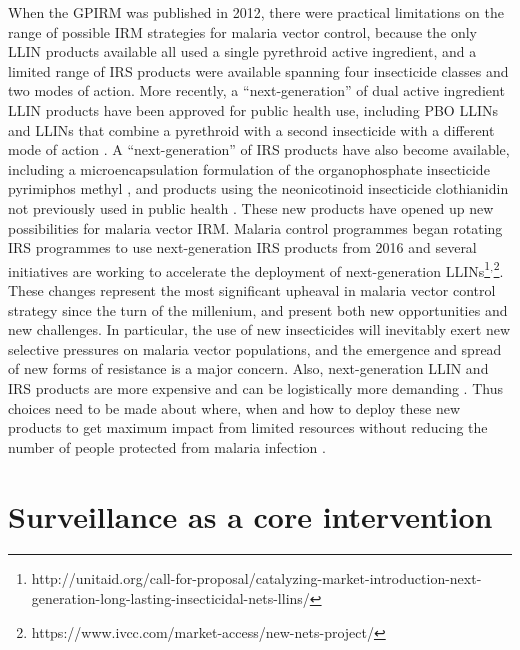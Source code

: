 \documentclass[a4paper,11pt,abstracton,hidelinks]{scrartcl}
\begin{document}
When the GPIRM was published in 2012, there were practical limitations on the range of possible IRM strategies for malaria vector control, because the only LLIN products available all used a single pyrethroid active ingredient, and a limited range of IRS products were available spanning four insecticide classes and two modes of action.
%
More recently, a ``next-generation'' of dual active ingredient LLIN products have been approved for public health use, including PBO LLINs \citep{Gleave2018} and LLINs that combine a pyrethroid with a second insecticide with a different mode of action \citep{Bayili2017,Tiono2018}.
%
A ``next-generation'' of IRS products have also become available, including a microencapsulation formulation of the organophosphate insecticide pyrimiphos methyl \citep{Oxborough2014}, and products using the neonicotinoid insecticide clothianidin not previously used in public health \citep{Oxborough2019}.
%
These new products have opened up new possibilities for malaria vector IRM.
%
Malaria control programmes began rotating IRS programmes to use next-generation IRS products from 2016 \citep{Tangena2020} and several initiatives are working to accelerate the deployment of next-generation LLINs\footnote{http://unitaid.org/call-for-proposal/catalyzing-market-introduction-next-generation-long-lasting-insecticidal-nets-llins/}$^{,}$\footnote{https://www.ivcc.com/market-access/new-nets-project/}.
%
These changes represent the most significant upheaval in malaria vector control strategy since the turn of the millenium, and present both new opportunities and new challenges.
%
In particular, the use of new insecticides will inevitably exert new selective pressures on malaria vector populations, and the emergence and spread of new forms of resistance is a major concern.
%
Also, next-generation LLIN and IRS products are more expensive and can be logistically more demanding \citep{TenBrink2018}.
%
Thus choices need to be made about where, when and how to deploy these new products to get maximum impact from limited resources without reducing the number of people protected from malaria infection \citep{WHO2017PBOLLIN}.


\section{Surveillance as a core intervention}
\end{document}
